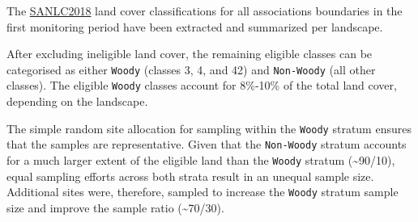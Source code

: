 \documentclass[
  letterpaper,
  DIV=11,
  numbers=noendperiod]{scrartcl}
\begin{document}
The
\href{https://egis.environment.gov.za/\%20sa_national_land_cover_datasets}{SANLC2018}
land cover classifications for all associations boundaries in the first
monitoring period have been extracted and summarized per landscape.

After excluding ineligible land cover, the remaining eligible classes
can be categorised as either \texttt{Woody} (classes 3, 4, and 42) and
\texttt{Non-Woody} (all other classes). The eligible \texttt{Woody}
classes account for 8\%-10\% of the total land cover, depending on the
landscape.

\begin{table}

\caption{\label{tbl-sanlc-strata}}


\end{table}%

The simple random site allocation for sampling within the \texttt{Woody}
stratum ensures that the samples are representative. Given that the
\texttt{Non-Woody} stratum accounts for a much larger extent of the
eligible land than the \texttt{Woody} stratum (\textasciitilde90/10),
equal sampling efforts across both strata result in an unequal sample
size. Additional sites were, therefore, sampled to increase the
\texttt{Woody} stratum sample size and improve the sample ratio
(\textasciitilde70/30).
\end{document}
